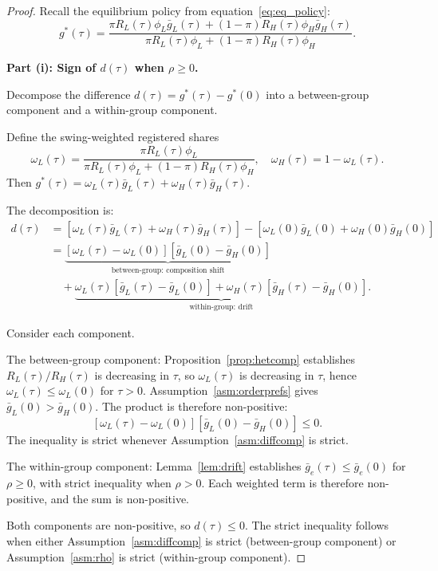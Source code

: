 \begin{proof}
Recall the equilibrium policy from equation~\eqref{eq:eq_policy}:
\[
g^*(\tau) = \frac{\pi R_L(\tau) \phi_L \bar g_L(\tau) + (1-\pi) R_H(\tau) \phi_H \bar g_H(\tau)}{\pi R_L(\tau) \phi_L + (1-\pi) R_H(\tau) \phi_H}.
\]

\textbf{Part (i): Sign of $d(\tau)$ when $\rho \geq 0$.}

Decompose the difference $d(\tau) = g^*(\tau) - g^*(0)$ into a between-group component and a within-group component.

Define the swing-weighted registered shares
\[
\omega_L(\tau) = \frac{\pi R_L(\tau) \phi_L}{\pi R_L(\tau) \phi_L + (1-\pi) R_H(\tau) \phi_H}, \quad \omega_H(\tau) = 1 - \omega_L(\tau).
\]
Then $g^*(\tau) = \omega_L(\tau) \bar g_L(\tau) + \omega_H(\tau) \bar g_H(\tau)$.

The decomposition is:
\begin{align}
d(\tau) &= [\omega_L(\tau) \bar g_L(\tau) + \omega_H(\tau) \bar g_H(\tau)] - [\omega_L(0) \bar g_L(0) + \omega_H(0) \bar g_H(0)] \\
&= \underbrace{[\omega_L(\tau) - \omega_L(0)][\bar g_L(0) - \bar g_H(0)]}_{\text{between-group: composition shift}} \nonumber\\
&\quad + \underbrace{\omega_L(\tau)[\bar g_L(\tau) - \bar g_L(0)] + \omega_H(\tau)[\bar g_H(\tau) - \bar g_H(0)]}_{\text{within-group: drift}}.
\label{eq:drift_decomp}
\end{align}

Consider each component.

The between-group component: Proposition~\ref{prop:hetcomp} establishes $R_L(\tau)/R_H(\tau)$ is decreasing in $\tau$, so $\omega_L(\tau)$ is decreasing in $\tau$, hence $\omega_L(\tau) \leq \omega_L(0)$ for $\tau > 0$. Assumption~\ref{asm:orderprefs} gives $\bar g_L(0) > \bar g_H(0)$. The product is therefore non-positive:
\[
[\omega_L(\tau) - \omega_L(0)][\bar g_L(0) - \bar g_H(0)] \leq 0.
\]
The inequality is strict whenever Assumption~\ref{asm:diffcomp} is strict.

The within-group component: Lemma~\ref{lem:drift} establishes $\bar g_e(\tau) \leq \bar g_e(0)$ for $\rho \geq 0$, with strict inequality when $\rho > 0$. Each weighted term is therefore non-positive, and the sum is non-positive.

Both components are non-positive, so $d(\tau) \leq 0$. The strict inequality follows when either Assumption~\ref{asm:diffcomp} is strict (between-group component) or Assumption~\ref{asm:rho} is strict (within-group component).


\end{proof}
